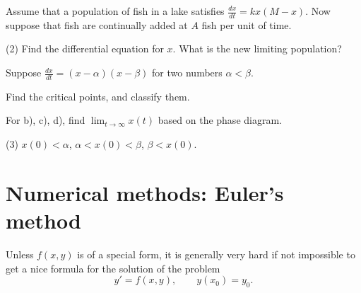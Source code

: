 \begin{exercise}
Assume that a population of fish in a lake satisfies
$\frac{dx}{dt} = kx(M-x)$.  Now suppose that fish are continually added
at $A$ fish per unit of time.
\begin{tasks}(2)
\task Find the differential equation for $x$.
\task What is the new limiting population?
\end{tasks}
\end{exercise}

\begin{exercise}
Suppose $\frac{dx}{dt} = (x-\alpha)(x-\beta)$ for two numbers $\alpha <
\beta$.
\begin{tasks}
\task Find the critical points, and classify them.
\end{tasks}
For b), c), d), find $\displaystyle \lim_{t\to\infty} x(t)$ based on
the phase diagram.
\begin{tasks}[resume](3)
\task $x(0) < \alpha$,
\task $\alpha < x(0) < \beta$,
\task $\beta < x(0)$.
\end{tasks}
\end{exercise}


\sectionnewpage
\section{Numerical methods: Euler's method}
\label{numer:section}


%


Unless $f(x,y)$ is of a special form,
it is generally very hard
if not impossible to get a nice formula for the solution of the problem
\begin{equation*}
y' = f(x,y), \qquad y(x_0) = y_0 .
\end{equation*}

